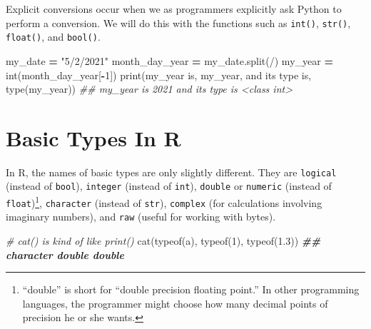 \documentclass[
  12pt,
  krantz2]{krantz}
\makeatletter
\newenvironment{Shaded}{\begin{snugshade}}{\end{snugshade}}
\newcommand{\BuiltInTok}[1]{#1}
\newcommand{\CommentTok}[1]{\textcolor[rgb]{0.37,0.37,0.37}{\textit{#1}}}
\newcommand{\DecValTok}[1]{\textcolor[rgb]{0.06,0.06,0.06}{#1}}
\newcommand{\DocumentationTok}[1]{\textcolor[rgb]{0.37,0.37,0.37}{\textbf{\textit{#1}}}}
\newcommand{\FloatTok}[1]{\textcolor[rgb]{0.06,0.06,0.06}{#1}}
\newcommand{\FunctionTok}[1]{\textcolor[rgb]{0,0,0}{#1}}
\newcommand{\NormalTok}[1]{#1}
\newcommand{\OperatorTok}[1]{\textcolor[rgb]{0.43,0.43,0.43}{\textbf{#1}}}
\newcommand{\StringTok}[1]{\textcolor[rgb]{0.5,0.5,0.5}{#1}}
\newenvironment{kframe}{%
\medskip{}
\setlength{\fboxsep}{.8em}
 \def\at@end@of@kframe{}%
 \ifinner\ifhmode%
  \def\at@end@of@kframe{\end{minipage}}%
  \begin{minipage}{\columnwidth}%
 \fi\fi%
 \def\FrameCommand##1{\hskip\@totalleftmargin \hskip-\fboxsep
 \colorbox{shadecolor}{##1}\hskip-\fboxsep
     \hskip-\linewidth \hskip-\@totalleftmargin \hskip\columnwidth}%
 \MakeFramed {\advance\hsize-\width
   \@totalleftmargin\z@ \linewidth\hsize
   \@setminipage}}%
 {\par\unskip\endMakeFramed%
 \at@end@of@kframe}
\renewenvironment{Shaded}{\begin{kframe}}{\end{kframe}}
\makeatother
\begin{document}
Explicit conversions occur when we as programmers explicitly ask Python to perform a conversion. We will do this with the functions such as \texttt{int()}, \texttt{str()}, \texttt{float()}, and \texttt{bool()}.

\begin{Shaded}
\begin{Highlighting}[]
\NormalTok{my\_date }\OperatorTok{=} \StringTok{"5/2/2021"}
\NormalTok{month\_day\_year }\OperatorTok{=}\NormalTok{ my\_date.split(}\StringTok{\textquotesingle{}/\textquotesingle{}}\NormalTok{)}
\NormalTok{my\_year }\OperatorTok{=} \BuiltInTok{int}\NormalTok{(month\_day\_year[}\OperatorTok{{-}}\DecValTok{1}\NormalTok{]) }
\BuiltInTok{print}\NormalTok{(}\StringTok{\textquotesingle{}my\_year is\textquotesingle{}}\NormalTok{, my\_year, }\StringTok{\textquotesingle{}and its type is\textquotesingle{}}\NormalTok{, }\BuiltInTok{type}\NormalTok{(my\_year))}
\CommentTok{\#\# my\_year is 2021 and its type is \textless{}class \textquotesingle{}int\textquotesingle{}\textgreater{}}
\end{Highlighting}
\end{Shaded}

\hypertarget{basic-types-in-r}{%
\section{Basic Types In R}\label{basic-types-in-r}}

In R, the names of basic types are only slightly different. They are \texttt{logical} (instead of \texttt{bool}), \texttt{integer} (instead of \texttt{int}), \texttt{double} or \texttt{numeric} (instead of \texttt{float})\footnote{``double'' is short for ``double precision floating point.'' In other programming languages, the programmer might choose how many decimal points of precision he or she wants.}, \texttt{character} (instead of \texttt{str}), \texttt{complex} (for calculations involving imaginary numbers), and \texttt{raw} (useful for working with bytes).

\begin{Shaded}
\begin{Highlighting}[]
\CommentTok{\# cat() is kind of like print()}
\FunctionTok{cat}\NormalTok{(}\FunctionTok{typeof}\NormalTok{(}\StringTok{\textquotesingle{}a\textquotesingle{}}\NormalTok{), }\FunctionTok{typeof}\NormalTok{(}\DecValTok{1}\NormalTok{), }\FunctionTok{typeof}\NormalTok{(}\FloatTok{1.3}\NormalTok{))}
\DocumentationTok{\#\# character double double}
\end{Highlighting}
\end{Shaded}
\end{document}
